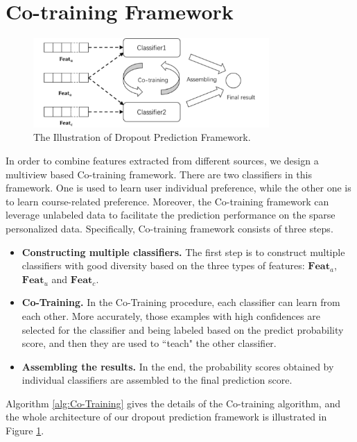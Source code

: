 \section{Co-training Framework}
	\label{sec:Co-Train}
	\begin{figure}
	\centering \includegraphics[width=9cm]{architecture.pdf}
	\caption{The Illustration of Dropout Prediction Framework.}
	\label{fig:arch}
	\end{figure}
	In order to combine features extracted from different sources, we design a multiview based Co-training framework. There are two classifiers in this framework. One is used to learn user individual preference, while the other one is to learn course-related preference.  Moreover, the Co-training framework can leverage unlabeled data to facilitate the prediction performance on the sparse personalized data. Specifically, Co-training framework consists of three steps.
	\begin{itemize}
		\item {\textbf{Constructing multiple classifiers.}} The first step is to construct multiple classifiers with good diversity based on the three types of features: $\mathbf{Feat}_a$, $\mathbf{Feat}_u$ and $\mathbf{Feat}_c$.
		
		\item{\textbf{Co-Training.}} In the Co-Training procedure, each classifier can learn from each other. More accurately, those examples with high confidences are selected for the classifier and being labeled based on the predict probability score,  and then they are used to ``teach" the other classifier.
		\item{\textbf{Assembling the results.}} In the end, the probability scores obtained by individual classifiers are assembled to the final prediction score.
	\end{itemize}
	Algorithm \ref{alg:Co-Training} gives the details of the Co-training algorithm, and the whole architecture of our dropout prediction framework is illustrated in Figure \ref{fig:arch}.
